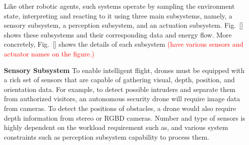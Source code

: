 Like other robotic agents, such systems operate by sampling the environment state, interpreting and reacting to it using three main subsystems, namely, a sensory subsystem, a perception subsystem, and an actuation subsystem. Fig.~\ref{} shows these subsystems and their corresponding data and energy flow. More concretely, Fig.~\ref{} shows the details of each subsystem \textcolor{red}{(have various sensors and actuator names on the figure.)}

\textbf{Sensory Subsystem} To enable intelligent flight, drones must be equipped with a rich set of sensors that are capable of gathering visual, depth, position, and orientation data. For example, to detect possible intruders and separate them from authorized visitors, an autonomous security drone will require image data from cameras. To detect the positions of obstacles, a drone would also require depth information from stereo or RGBD cameras. Number and type of sensors is highly dependent on the workload requirement such as, and various system constraints such as perception subsystem capability to process them. 

